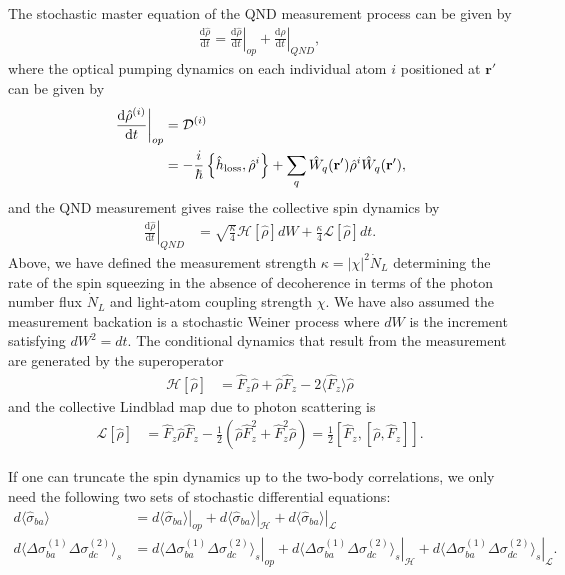\documentclass[preprint,aps,pra,onecolumn,superscriptaddress]{revtex4-1} %
\newcommand{\dt}[1]{\frac{{\mathrm d} {#1}}{{\mathrm d}t}}
\def\br{\mathbf{r}}
\newcommand{\expect}[1]{\big\langle #1 \big\rangle}
\begin{document}
The stochastic master equation of the QND measurement process can be given by
\begin{align}
\dt{\hat{\rho}}=\left.\dt{\hat{\rho}}\right|_{op} + \left.\dt{\hat{\rho}}\right|_{QND},
\end{align}
where the optical pumping dynamics on each individual atom $i$ positioned at $\br'$ can be given by
\begin{align}
\left.\dt{\hat{\rho}^{(i)}}\right|_{op} &=\mathcal{D}^{(i)}\\
&= -\frac{i}{\hbar} \left\{\hat{h}_{\rm loss},\hat{\rho}^{i} \right\} + \sum_q \hat{W}_q(\br')\hat{\rho}^{i}\hat{W}_q(\br'),
\end{align}
and the QND measurement gives raise the collective spin dynamics by
\begin{align}
\left.\dt{\hat{\rho}}\right|_{QND} &= \sqrt{\frac{\kappa}{4}}\mathcal{H}\left[\hat{\rho} \right]dW + \frac{\kappa}{4}\mathcal{L}\left[ \hat{\rho}\right]dt.
\end{align}
Above, we have defined the measurement strength $\kappa =|\chi|^2\dot{N}_L $ determining the rate of the spin squeezing in the absence of decoherence in terms of the photon number flux $\dot{N}_L$ and light-atom coupling strength $\chi$. We have also assumed the measurement backation is a stochastic Weiner process where $dW$ is the increment satisfying $dW^2 = dt$. The conditional dynamics that result from the measurement are generated by the superoperator
\begin{align}
\mathcal{H}\left[ \hat{\rho}\right] &= \hat{F}_z\hat{\rho} + \hat{\rho}\hat{F}_z -2\expect{\hat{F}_z}\hat{\rho}
\end{align}
and the collective Lindblad map due to photon scattering is
\begin{align}
\mathcal{L}\left[ \hat{\rho} \right] &= \hat{F}_z\hat{\rho}\hat{F}_z-\frac{1}{2}\left(\hat{\rho}\hat{F}_z^2+\hat{F}_z^2\hat{\rho} \right)=\frac{1}{2}\left[\hat{F}_z,\left[\hat{\rho},\hat{F}_z \right] \right].
\end{align}

If one can truncate the spin dynamics up to the two-body correlations, we only need the following two sets of stochastic differential equations:
\begin{subequations}
\begin{align}
d\expect{\hat{\sigma}_{ba}} &=\left. d{\expect{\hat{\sigma}_{ba}}}\right|_{op} + \left. d{\expect{\hat{\sigma}_{ba}}}\right|_{\mathcal{H}}+\left. d{\expect{\hat{\sigma}_{ba}}}\right|_{\mathcal{L}} \\
d\expect{\Delta \sigma_{ba}^{(1)}\Delta \sigma_{dc}^{(2)}}_s &= \left. d{\expect{\Delta \sigma_{ba}^{(1)}\Delta \sigma_{dc}^{(2)}}_s}\right|_{op} + \left. d{\expect{\Delta \sigma_{ba}^{(1)}\Delta \sigma_{dc}^{(2)}}_s}\right|_{\mathcal{H}} + \left. d{\expect{\Delta \sigma_{ba}^{(1)}\Delta \sigma_{dc}^{(2)}}_s}\right|_{\mathcal{L}}.
\end{align}
\end{subequations}
\end{document}
